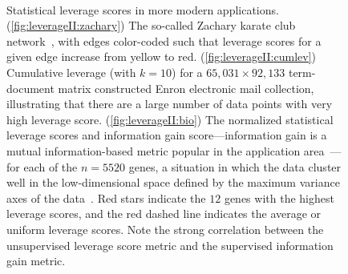 \documentclass[twoside]{article}
\begin{document}
\begin{figure}
   \begin{center}
 \qquad {} \\
       \end{center}
\caption{Statistical leverage scores in more modern applications.
(\ref{fig:leverageII:zachary})
The so-called Zachary karate club network~\cite{zachary77karate}, with edges
color-coded such that leverage scores for a given edge increase from yellow
to red.
(\ref{fig:leverageII:cumlev})
Cumulative leverage (with $k=10$) for a $65,031 \times 92,133$ term-document 
matrix constructed Enron electronic mail collection, illustrating 
that there are a large number of data points with very high leverage score.
(\ref{fig:leverageII:bio})
The normalized statistical leverage scores and information gain 
score---information gain is a mutual information-based metric popular in 
the application area~\cite{Paschou07b,CUR_PNAS}---for each of the $n = 5520$ 
genes, a situation in which the data cluster well in the low-dimensional 
space defined by the maximum variance axes of the data~\cite{CUR_PNAS}.
Red stars indicate the $12$ genes with the highest leverage scores, and the 
red dashed line indicates the average or uniform leverage scores.
Note the strong correlation between the unsupervised leverage score metric 
and the supervised information gain metric.
}
\label{fig:leverageII}
\end{figure}
\end{document}
